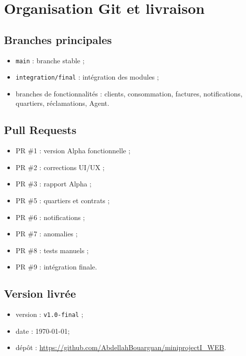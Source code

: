 \chapter{Organisation Git et livraison}

\section{Branches principales}
\begin{itemize}[leftmargin=*]
  \item \texttt{main} : branche stable ;
  \item \texttt{integration/final} : intégration des modules ;
  \item branches de fonctionnalités : clients, consommation, factures, notifications, quartiers, réclamations, Agent.
\end{itemize}

\section{Pull Requests}
\begin{itemize}[leftmargin=*]
  \item PR \#1 : version Alpha fonctionnelle ;
  \item PR \#2 : corrections UI/UX ;
  \item PR \#3 : rapport Alpha ;
  \item PR \#5 : quartiers et contrats ;
  \item PR \#6 : notifications ;
  \item PR \#7 : anomalies ;
  \item PR \#8 : tests manuels ;
  \item PR \#9 : intégration finale.
\end{itemize}

\section{Version livrée}
\begin{itemize}[leftmargin=*]
  \item version : \texttt{v1.0-final} ;
  \item date : \today ;
  \item dépôt : \url{https://github.com/AbdellahBouarguan/miniprojectI_WEB}.
\end{itemize}
